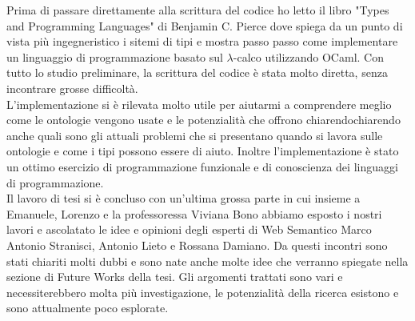     Prima di passare direttamente alla scrittura del codice ho letto il libro "Types and Programming Languages" \cite{} di Benjamin C. Pierce dove spiega da un punto di vista
    più ingegneristico i sitemi di tipi e mostra passo passo come implementare un linguaggio di programmazione basato sul $\lambda$-calco utilizzando OCaml.
    Con tutto lo studio preliminare, la scrittura del codice è stata molto diretta, senza incontrare grosse difficoltà.
    \\L'implementazione si è rilevata molto utile per aiutarmi a comprendere meglio come le ontologie vengono usate e le potenzialità che offrono chiarendochiarendo anche
    quali sono gli attuali problemi che si presentano quando si lavora sulle ontologie e come i tipi possono essere di aiuto. Inoltre l'implementazione è stato un ottimo
    esercizio di programmazione funzionale e di conoscienza dei linguaggi di programmazione.
    \\Il lavoro di tesi si è concluso con un'ultima grossa parte in cui insieme a Emanuele, Lorenzo e la professoressa Viviana Bono abbiamo esposto i nostri lavori e ascolatato le idee e opinioni degli esperti
    di Web Semantico Marco Antonio Stranisci, Antonio Lieto e Rossana Damiano. Da questi incontri sono stati chiariti molti dubbi e sono nate anche molte idee che verranno
    spiegate nella sezione di Future Works %
    della tesi. Gli argomenti trattati sono vari e necessiterebbero molta più investigazione, le potenzialità della ricerca esistono
    e sono attualmente poco esplorate. 